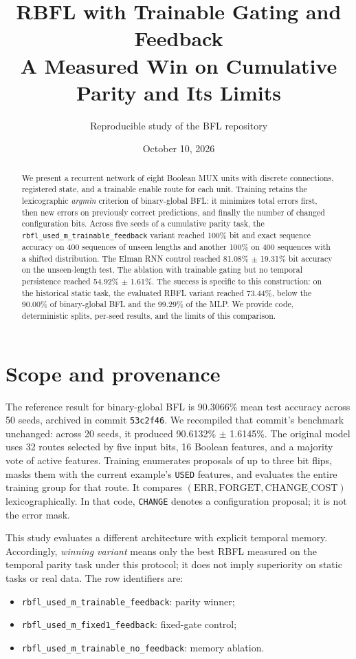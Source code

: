 \documentclass[10pt,a4paper]{article}
\title{RBFL with Trainable Gating and Feedback\\
\large A Measured Win on Cumulative Parity and Its Limits}
\author{Reproducible study of the BFL repository}
\date{October 10, 2026}
\begin{document}
\maketitle

\begin{abstract}
We present a recurrent network of eight Boolean MUX units with discrete connections, registered state, and a trainable enable route for each unit. Training retains the lexicographic \emph{argmin} criterion of binary-global BFL: it minimizes total errors first, then new errors on previously correct predictions, and finally the number of changed configuration bits. Across five seeds of a cumulative parity task, the \texttt{rbfl\_used\_m\_trainable\_feedback} variant reached 100\% bit and exact sequence accuracy on 400 sequences of unseen lengths and another 100\% on 400 sequences with a shifted distribution. The Elman RNN control reached 81.08\% $\pm$ 19.31\% bit accuracy on the unseen-length test. The ablation with trainable gating but no temporal persistence reached 54.92\% $\pm$ 1.61\%. The success is specific to this construction: on the historical static task, the evaluated RBFL variant reached 73.44\%, below the 90.00\% of binary-global BFL and the 99.29\% of the MLP. We provide code, deterministic splits, per-seed results, and the limits of this comparison.
\end{abstract}

\section{Scope and provenance}
The reference result for binary-global BFL is 90.3066\% mean test accuracy across 50 seeds, archived in commit \texttt{53c2f46}. We recompiled that commit's benchmark unchanged: across 20 seeds, it produced 90.6132\% $\pm$ 1.6145\%. The original model uses 32 routes selected by five input bits, 16 Boolean features, and a majority vote of active features. Training enumerates proposals of up to three bit flips, masks them with the current example's \texttt{USED} features, and evaluates the entire training group for that route. It compares $(\mathrm{ERR},\mathrm{FORGET},\mathrm{CHANGE\_COST})$ lexicographically. In that code, \texttt{CHANGE} denotes a configuration proposal; it is not the error mask.

This study evaluates a different architecture with explicit temporal memory. Accordingly, \emph{winning variant} means only the best RBFL measured on the temporal parity task under this protocol; it does not imply superiority on static tasks or real data. The row identifiers are:
\begin{itemize}
\item \texttt{rbfl\_used\_m\_trainable\_feedback}: parity winner;
\item \texttt{rbfl\_used\_m\_fixed1\_feedback}: fixed-gate control;
\item \texttt{rbfl\_used\_m\_trainable\_no\_feedback}: memory ablation.
\end{itemize}
\end{document}
